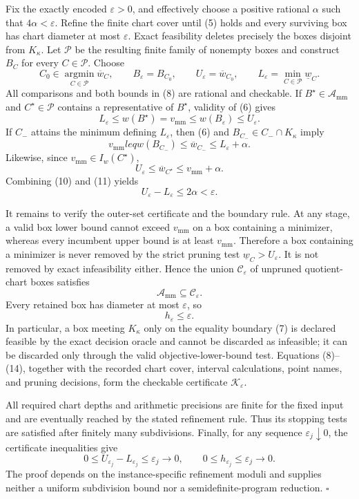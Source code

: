 Fix the exactly encoded \(\varepsilon>0\), and effectively choose a positive rational \(\alpha\) such that \(4\alpha<\varepsilon\).  Refine the finite chart cover until (5) holds and every surviving box has chart diameter at most \(\varepsilon\).  Exact feasibility deletes precisely the boxes disjoint from \(K_\kappa\).  Let \(\mathcal P\) be the resulting finite family of nonempty boxes and construct \(B_C\) for every \(C\in\mathcal P\).  Choose
\[
C_0\in\operatorname*{argmin}_{C\in\mathcal P}\overline w_C,
\qquad
B_\varepsilon=B_{C_0},
\qquad
U_\varepsilon=\overline w_{C_0},
\qquad
L_\varepsilon=\min_{C\in\mathcal P}\underline w_C. \tag{8}
\]
All comparisons and both bounds in (8) are rational and checkable.  If \(B^\star\in\mathcal A_{\mathrm{mm}}\) and \(C^\star\in\mathcal P\) contains a representative of \(B^\star\), validity of (6) gives
\[
L_\varepsilon\leq w(B^\star)=v_{\mathrm{mm}}
\leq w(B_\varepsilon)\leq U_\varepsilon. \tag{9}
\]
If \(C_-\) attains the minimum defining \(L_\varepsilon\), then (6) and \(B_{C_-}\in C_-\cap K_\kappa\) imply
\[
v_{\mathrm{mm}}leq w(B_{C_-})
\leq\overline w_{C_-}
\leq L_\varepsilon+\alpha.
\tag{10}
\]
Likewise, since \(v_{\mathrm{mm}}\in I_w(C^\star)\),
\[
U_\varepsilon\leq\overline w_{C^\star}
\leq v_{\mathrm{mm}}+\alpha. \tag{11}
\]
Combining (10) and (11) yields
\[
U_\varepsilon-L_\varepsilon\leq2\alpha<\varepsilon. \tag{12}
\]

It remains to verify the outer-set certificate and the boundary rule.  At any stage, a valid box lower bound cannot exceed \(v_{\mathrm{mm}}\) on a box containing a minimizer, whereas every incumbent upper bound is at least \(v_{\mathrm{mm}}\).  Therefore a box containing a minimizer is never removed by the strict pruning test
\(\underline w_C>U_\varepsilon\).  It is not removed by exact infeasibility either.  Hence the union \(\mathcal C_\varepsilon\) of unpruned quotient-chart boxes satisfies
\[
\mathcal A_{\mathrm{mm}}\subseteq\mathcal C_\varepsilon. \tag{13}
\]
Every retained box has diameter at most \(\varepsilon\), so
\[
h_\varepsilon\leq\varepsilon. \tag{14}
\]
In particular, a box meeting \(K_\kappa\) only on the equality boundary (7) is declared feasible by the exact decision oracle and cannot be discarded as infeasible; it can be discarded only through the valid objective-lower-bound test.  Equations (8)--(14), together with the recorded chart cover, interval calculations, point names, and pruning decisions, form the checkable certificate \(\mathscr K_\varepsilon\).

All required chart depths and arithmetic precisions are finite for the fixed input and are eventually reached by the stated refinement rule.  Thus its stopping tests are satisfied after finitely many subdivisions.  Finally, for any sequence \(\varepsilon_j\downarrow0\), the certificate inequalities give
\[
0\leq U_{\varepsilon_j}-L_{\varepsilon_j}\leq\varepsilon_j\longrightarrow0,
\qquad
0\leq h_{\varepsilon_j}\leq\varepsilon_j\longrightarrow0.
\]
The proof depends on the instance-specific refinement moduli and supplies neither a uniform subdivision bound nor a semidefinite-program reduction. \(\square\)